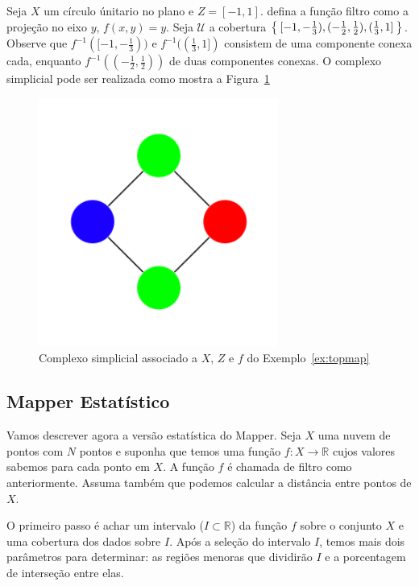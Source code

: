 \begin{ex}\label{ex:topmap}
    Seja $X$ um círculo únitario no plano e $Z=[-1,1]$. defina a função filtro como
    a projeção no eixo $y$, $f(x,y) = y$. Seja $\mathcal{U}$ a cobertura $\Set{[-1,-\frac{1}{3}), 
    (-\frac{1}{2},\frac{1}{2}), (\frac{1}{3}, 1]}$. Observe que $f^{-1}([-1,-\frac{1}{3}))$
    e $f^{-1}((\frac{1}{3}, 1])$  consistem de uma componente conexa cada, enquanto 
    $f^{-1}((-\frac{1}{2}, \frac{1}{2}))$ de duas componentes conexas. O complexo simplicial pode
    ser realizada como mostra a Figura~\ref{fig:topmap}
    \begin{figure}
        \centering
        \includegraphics[width=0.7\textwidth]{images/topmap.png}
        \caption{Complexo simplicial associado a $X$, $Z$ e $f$ 
                 do Exemplo~\ref{ex:topmap}}
        \label{fig:topmap}
        \fautor
    \end{figure}
\end{ex}

\subsection{Mapper Estatístico} 

Vamos descrever agora a versão estatística do Mapper. Seja $X$ uma nuvem de pontos com $N$ pontos
e suponha que temos uma função $f \colon X \to \mathbb{R}$ cujos valores sabemos para cada ponto
em $X$. A função $f$ é chamada de filtro como anteriormente. Assuma também que podemos calcular a 
distância entre pontos de $X$. 

O primeiro passo é achar um intervalo ($I \subset \mathbb{R}$) da função $f$ sobre o conjunto
$X$ e uma cobertura dos dados sobre $I$. Após a seleção do intervalo $I$, temos mais dois parâmetros 
para determinar: as regiões menoras que dividirão $I$ e a porcentagem de interseção entre elas. 


